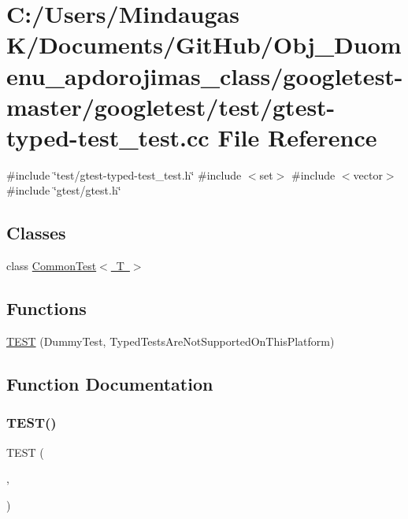\hypertarget{googletest-master_2googletest_2test_2gtest-typed-test__test_8cc}{}\section{C\+:/\+Users/\+Mindaugas K/\+Documents/\+Git\+Hub/\+Obj\+\_\+\+Duomenu\+\_\+apdorojimas\+\_\+class/googletest-\/master/googletest/test/gtest-\/typed-\/test\+\_\+test.cc File Reference}
\label{googletest-master_2googletest_2test_2gtest-typed-test__test_8cc}
{\ttfamily \#include \char`\"{}test/gtest-\/typed-\/test\+\_\+test.\+h\char`\"{}}\newline
{\ttfamily \#include $<$set$>$}\newline
{\ttfamily \#include $<$vector$>$}\newline
{\ttfamily \#include \char`\"{}gtest/gtest.\+h\char`\"{}}\newline
\subsection*{Classes}
\begin{DoxyCompactItemize}
\item 
class \mbox{\hyperlink{class_common_test}{Common\+Test$<$ T $>$}}
\end{DoxyCompactItemize}
\subsection*{Functions}
\begin{DoxyCompactItemize}
\item 
\mbox{\hyperlink{googletest-master_2googletest_2test_2gtest-typed-test__test_8cc_a7d2c906b58ca05100fcea4e00858d2c6}{T\+E\+ST}} (Dummy\+Test, Typed\+Tests\+Are\+Not\+Supported\+On\+This\+Platform)
\end{DoxyCompactItemize}


\subsection{Function Documentation}
\mbox{\label{googletest-master_2googletest_2test_2gtest-typed-test__test_8cc_a7d2c906b58ca05100fcea4e00858d2c6}} 
\subsubsection{\texorpdfstring{TEST()}{TEST()}}
{\footnotesize\ttfamily T\+E\+ST (\begin{DoxyParamCaption}\item[{Dummy\+Test}]{,  }\item[{Typed\+Tests\+Are\+Not\+Supported\+On\+This\+Platform}]{ }\end{DoxyParamCaption})}

